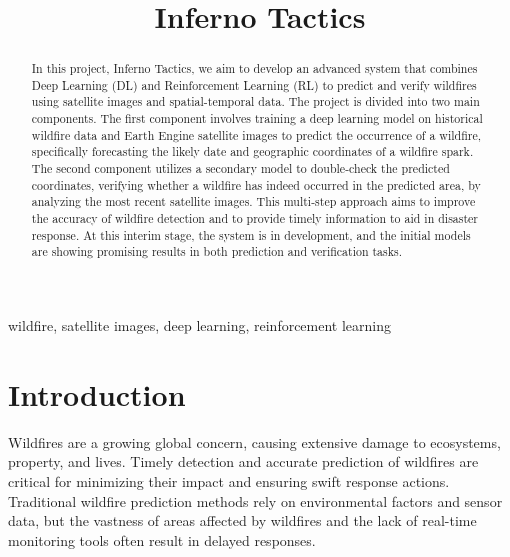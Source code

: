 \documentclass[conference]{IEEEtran}
\begin{document}
\title{Inferno Tactics\\
}

\author{
\and
{}
}

\maketitle

\begin{abstract}
In this project, Inferno Tactics, we aim to develop an advanced system that combines Deep Learning (DL) and Reinforcement Learning (RL) to predict and verify wildfires using satellite images and spatial-temporal data. The project is divided into two main components. The first component involves training a deep learning model on historical wildfire data and Earth Engine satellite images to predict the occurrence of a wildfire, specifically forecasting the likely date and geographic coordinates of a wildfire spark. The second component utilizes a secondary model to double-check the predicted coordinates, verifying whether a wildfire has indeed occurred in the predicted area, by analyzing the most recent satellite images. This multi-step approach aims to improve the accuracy of wildfire detection and to provide timely information to aid in disaster response. At this interim stage, the system is in development, and the initial models are showing promising results in both prediction and verification tasks.
\end{abstract}

\begin{IEEEkeywords}
wildfire, satellite images, deep learning, reinforcement learning
\end{IEEEkeywords}

\section{Introduction}
Wildfires are a growing global concern, causing extensive damage to ecosystems, property, and lives. Timely detection and accurate prediction of wildfires are critical for minimizing their impact and ensuring swift response actions. Traditional wildfire prediction methods rely on environmental factors and sensor data, but the vastness of areas affected by wildfires and the lack of real-time monitoring tools often result in delayed responses.\\
\end{document}
